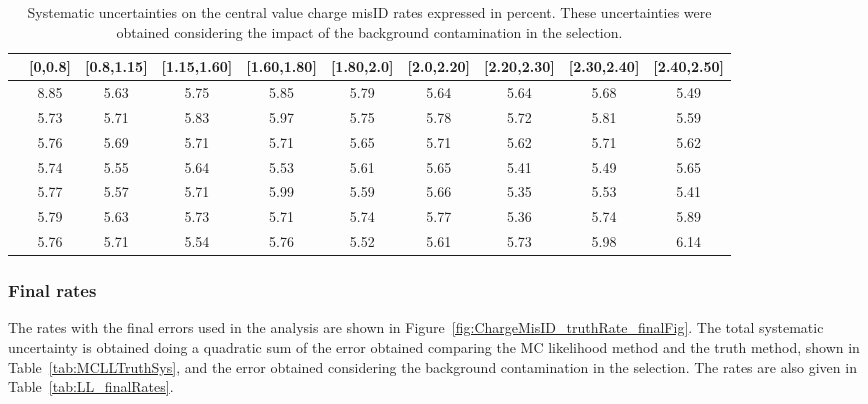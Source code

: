 \begin{table}
\footnotesize
\centering
\begin{tabular}{c|c|c|c|c|c|c|c|c|c}
  \hline
  \backslashbox{\pt[\GeV]}{$|$\eta$|$} &[0,0.8] &[0.8,1.15] &[1.15,1.60] &[1.60,1.80] &[1.80,2.0] &[2.0,2.20] &[2.20,2.30] &[2.30,2.40] &[2.40,2.50] \\ 
  \hline
  [15,30] &8.85 &5.63 &5.75 &5.85 &5.79 &5.64 &5.64 &5.68 &5.49 \\
  \hline
  [30,40] &5.73 &5.71 &5.83 &5.97 &5.75 &5.78 &5.72 &5.81 &5.59 \\
  \hline
  [40,50] &5.76 &5.69 &5.71 &5.71 &5.65 &5.71 &5.62 &5.71 &5.62 \\
  \hline
  [50,60] &5.74 &5.55 &5.64 &5.53 &5.61 &5.65 &5.41 &5.49 &5.65 \\
  \hline
  [60,80] &5.77 &5.57 &5.71 &5.99 &5.59 &5.66 &5.35 &5.53 &5.41 \\
  \hline
  [80,120] &5.79 &5.63 &5.73 &5.71 &5.74 &5.77 &5.36 &5.74 &5.89 \\
  \hline
  [120,1000] &5.76 &5.71 &5.54 &5.76 &5.52 &5.61 &5.73 &5.98 &6.14  \\
  \hline
\end{tabular}
\caption{Systematic uncertainties on the central value charge misID rates expressed in percent. These uncertainties were obtained considering the impact of the background contamination in the selection.}
\label{tab:Charge_MisID_Bkg_Sys}
\end{table} 
 


\subsubsection{Final rates}

The rates with the final errors used in the analysis are shown in Figure~\ref{fig:ChargeMisID_truthRate_finalFig}. The total systematic uncertainty is obtained doing a quadratic sum of the error obtained comparing the MC likelihood method and the truth method, shown in Table~\ref{tab:MCLLTruthSys}, and the error obtained considering the background contamination in the selection. The rates are also given in Table~\ref{tab:LL_finalRates}.

